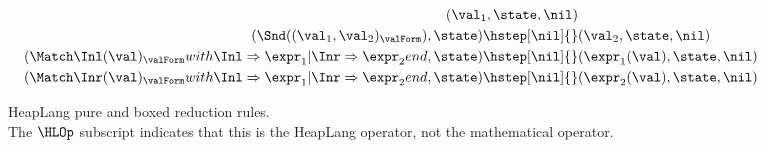 \begin{figure}[p]
\begin{align*}
  (\val_1, \state, \nil) \\
(\Snd((\val_1, \val_2)_\valForm), \state) \hstep[\nil]{}&
  (\val_2, \state, \nil) \\
(\Match \Inl(\val)_\valForm with \Inl => \expr_1 | \Inr => \expr_2 end, \state) \hstep[\nil]{}&
  (\expr_1(\val), \state, \nil) \\
(\Match \Inr(\val)_\valForm with \Inl => \expr_1 | \Inr => \expr_2 end, \state) \hstep[\nil]{}&
  (\expr_2(\val), \state, \nil)
\end{align*}
\caption{HeapLang pure and boxed reduction rules. \\ \small
The $\HLOp$ subscript indicates that this is the HeapLang operator, not the mathematical operator.}
\label{fig:heaplang-reduction-pure}
\end{figure}

